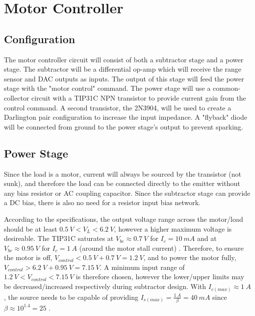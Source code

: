 \graphicspath{{content/2_design/figures/}}
\section{Motor Controller}

\subsection{Configuration}

The motor controller circuit will consist of both a subtractor stage and a power stage. The subtractor will be a differential op-amp which will receive
the range sensor and DAC outputs as inputs. The output of this stage will feed the power stage with the "motor control" command. The power stage will use a common-collector circuit
with a TIP31C NPN transistor to provide current gain from the control command. A second transistor, the 2N3904, will be used to create a Darlington pair configuration to increase the input impedance.
A "flyback" diode will be connected from ground to the power stage's output to prevent sparking.

\subsection{Power Stage}{\label{motorController_design_powerStage}}

Since the load is a motor, current will always be sourced by the transistor (not sunk), and therefore the load can be connected directly to the
emitter without any bias resistor or AC coupling capacitor. Since the subtractor stage can provide a DC bias, there is also no need for a resistor input bias network.

According to the specifications, the output voltage range across the motor/load should be at least $\SI{0.5}{V} < V_L < \SI{6.2}{V}$,
however a higher maximum voltage is desireable. The TIP31C saturates at $V_{be} \approx \SI{0.7}{V}$ for $I_c = \SI{10}{mA}$ and at $V_{be} \approx \SI{0.95}{V}$ for $I_c = \SI{1}{A}$
(around the motor stall current) \cite{datasheetTIP31C}. Therefore, to ensure the motor is off, $V_{control} < \SI{0.5}{V} + \SI{0.7}{V} = \SI{1.2}{V}$,
and to power the motor fully, $V_{control} > \SI{6.2}{V} + \SI{0.95}{V} = \SI{7.15}{V}$. A minimum input range of $\SI{1.2}{V} < V_{control} < \SI{7.15}{V}$ is therefore chosen,
however the lower/upper limits may be decreased/increased respectively during subtractor design. With $I_{c(max)} \approx \SI{1}{A}$, the source needs to be capable of providing
$I_{s(max)} = \frac{\SI{1}{A}}{\beta} = \SI{40}{mA}$ since $\beta \approx 10^{1.4} = 25$ \cite{datasheetTIP31C}.


